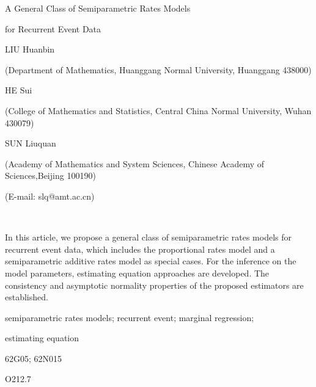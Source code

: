 \documentclass[twoside,a4paper]{ctexart}
\begin{document}
\vbox{\vskip15pt}

\centerline{\four A General Class of Semiparametric Rates Models}  
\vskip2pt
\centerline{\four for Recurrent Event Data}
\vskip12pt
\centerline{\two LIU Huanbin}
\vskip5pt
\centerline{({\three Department of Mathematics, Huanggang Normal University, Huanggang} {\small 438000})}
\vskip7pt
\centerline{\two HE Sui}
\vskip5pt
\centerline{({\three College of Mathematics and Statistics, Central China Normal University, Wuhan} {\small 430079})}    
\vskip7pt
\centerline{\two SUN Liuquan}
\vskip5pt
\centerline{({\three Academy of Mathematics and System Sciences, Chinese Academy of Sciences,Beijing} {\small 100190})}
\vskip2pt
\centerline{({\three E-mail: slq@amt.ac.cn})}

\

\quad In this article, we propose a general class of semiparametric rates
 models for recurrent event data, which includes the proportional rates model and
 a semiparametric additive rates model  as special cases. For the inference on the model parameters,
 estimating equation approaches are developed. The consistency and asymptotic normality properties of
 the proposed estimators are established. 

\vskip5pt

\quad semiparametric rates models; recurrent event; marginal regression; 

\hskip1.54cm estimating equation

\quad 62G05; 62N015

\quad O212.7

    

 
 
\end{document}
